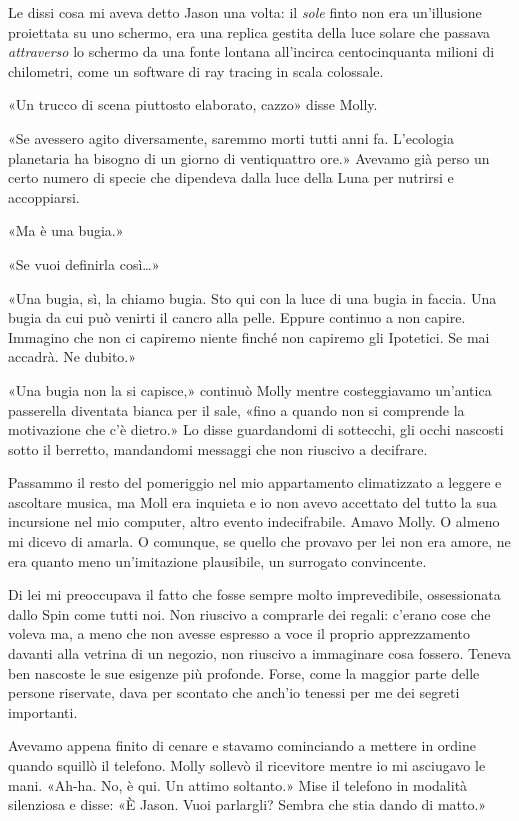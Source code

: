 Le dissi cosa mi aveva detto Jason una volta: il \emph{sole} finto non
era un'illusione proiettata su uno schermo, era una replica gestita
della luce solare che passava \emph{attraverso} lo schermo da una fonte
lontana all'incirca centocinquanta milioni di chilometri, come un
software di ray tracing in scala colossale.

«Un trucco di scena piuttosto elaborato, cazzo» disse Molly.

«Se avessero agito diversamente, saremmo morti tutti anni fa. L'ecologia
planetaria ha bisogno di un giorno di ventiquattro ore.» Avevamo già
perso un certo numero di specie che dipendeva dalla luce della Luna per
nutrirsi e accoppiarsi.

«Ma è una bugia.»

«Se vuoi definirla così\ldots»

«Una bugia, sì, la chiamo bugia. Sto qui con la luce di una bugia in
faccia. Una bugia da cui può venirti il cancro alla pelle. Eppure
continuo a non capire. Immagino che non ci capiremo niente finché non
capiremo gli Ipotetici. Se mai accadrà. Ne dubito.»

«Una bugia non la si capisce,» continuò Molly mentre costeggiavamo
un'antica passerella diventata bianca per il sale, «fino a quando non si
comprende la motivazione che c'è dietro.» Lo disse guardandomi di
sottecchi, gli occhi nascosti sotto il berretto, mandandomi messaggi che
non riuscivo a decifrare.

Passammo il resto del pomeriggio nel mio appartamento climatizzato a
leggere e ascoltare musica, ma Moll era inquieta e io non avevo
accettato del tutto la sua incursione nel mio computer, altro evento
indecifrabile. Amavo Molly. O almeno mi dicevo di amarla. O comunque, se
quello che provavo per lei non era amore, ne era quanto meno
un'imitazione plausibile, un surrogato convincente.

Di lei mi preoccupava il fatto che fosse sempre molto imprevedibile,
ossessionata dallo Spin come tutti noi. Non riuscivo a comprarle dei
regali: c'erano cose che voleva ma, a meno che non avesse espresso a
voce il proprio apprezzamento davanti alla vetrina di un negozio, non
riuscivo a immaginare cosa fossero. Teneva ben nascoste le sue esigenze
più profonde. Forse, come la maggior parte delle persone riservate, dava
per scontato che anch'io tenessi per me dei segreti importanti.

Avevamo appena finito di cenare e stavamo cominciando a mettere in
ordine quando squillò il telefono. Molly sollevò il ricevitore mentre io
mi asciugavo le mani. «Ah-ha. No, è qui. Un attimo soltanto.» Mise il
telefono in modalità silenziosa e disse: «È Jason. Vuoi parlargli?
Sembra che stia dando di matto.»

